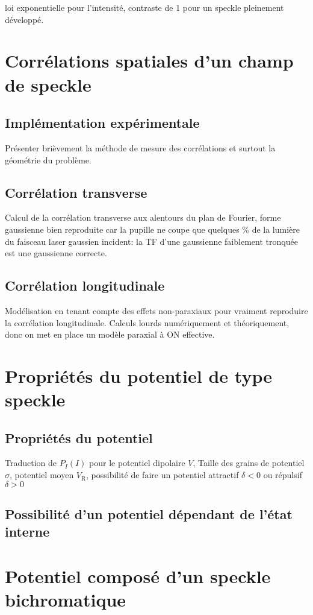  loi exponentielle pour l'intensité, contraste de 1 pour un speckle pleinement développé.

\section{Corrélations spatiales d'un champ de speckle}
\subsection{Implémentation expérimentale}
Présenter brièvement la méthode de mesure des corrélations et surtout la géométrie du problème.

\subsection{Corrélation transverse}
Calcul de la corrélation transverse aux alentours du plan de Fourier, forme gaussienne bien reproduite car la pupille ne coupe que quelques \% de la lumière du faisceau laser gaussien incident: la TF d'une gaussienne faiblement tronquée est une gaussienne correcte.

\subsection{Corrélation longitudinale}
Modélisation en tenant compte des effets non-paraxiaux pour vraiment reproduire la corrélation longitudinale. Calculs lourds numériquement et théoriquement, donc on met en place un modèle paraxial à ON effective.

\section{Propriétés du potentiel de type speckle}
\subsection{Propriétés du potentiel}
Traduction de $P_I(I)$ pour le potentiel dipolaire $V$, Taille des grains de potentiel $\sigma$, potentiel moyen $V_{\mathrm{R}}$, possibilité de faire un potentiel attractif $\delta <0$ ou répulsif $\delta > 0$
\subsection{Possibilité d'un potentiel dépendant de l'état interne}

\section{Potentiel composé d'un speckle bichromatique}
